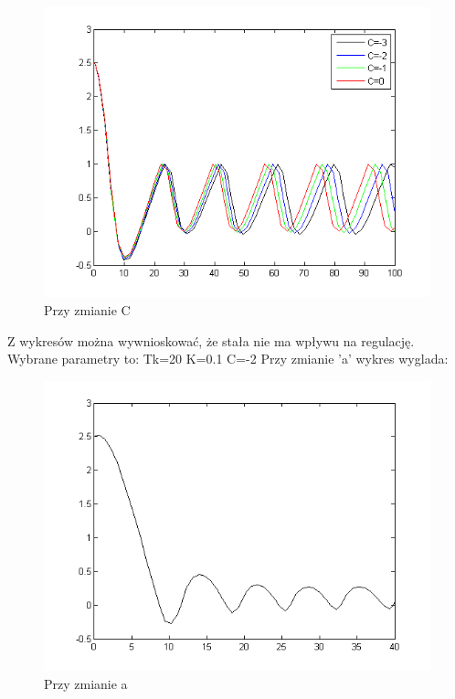 \documentclass[a4paper,10pt]{article}
\begin{document}
\begin{enumerate}
\begin{figure}[!h]
    \centering
	\includegraphics[width=120mm]{CW3-korekcja-trojpolozeniowy-e_C.png}
	\caption{Przy zmianie C}
    \label{fig:Rysunek}
\end{figure}
Z wykresów można wywnioskować, że stała nie ma wpływu na regulację.
\newline
Wybrane parametry to:
Tk=20
K=0.1
C=-2
\newpage
Przy zmianie 'a' wykres wyglada:
\begin{figure}[!h]
    \centering
	\includegraphics[width=120mm]{CW3-korekcja-trojpolozeniowyBH-e_a.png}
	\caption{Przy zmianie a}
    \label{fig:Rysunek}
\end{figure}


\end{enumerate}
\end{document}
